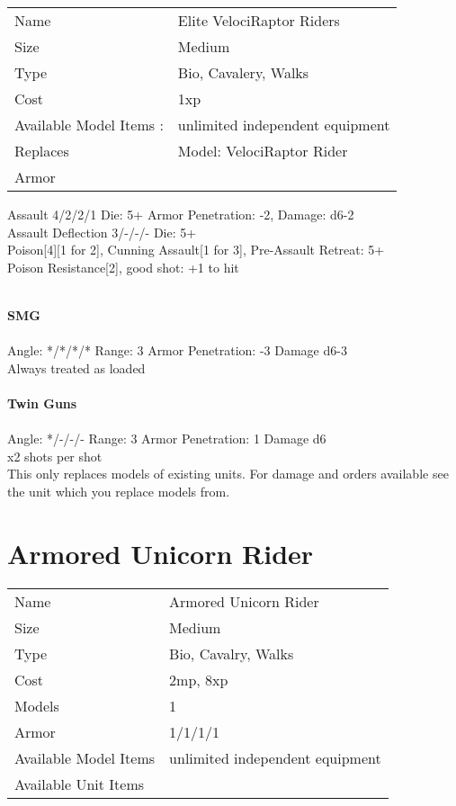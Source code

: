 \begin{tabular}{ll}
  Name & Elite VelociRaptor Riders \\
  Size & Medium\\
  Type & Bio, Cavalery, Walks\\
  Cost & 1xp\\
  Available Model Items : &unlimited independent equipment\\
  Replaces & Model: VelociRaptor Rider\\
  Armor & 
\end{tabular}



Assault 4/2/2/1 Die: 5+ Armor Penetration: -2, Damage: d6-2 \\
Assault Deflection 3/-/-/- Die: 5+\\
Poison[4][1 for 2], Cunning Assault[1 for 3], Pre-Assault Retreat: 5+
\ \\

Poison Resistance[2], good shot: +1 to hit

\ \\
{\bf SMG } \\
\ \\
Angle: */*/*/* Range: 3 Armor Penetration: -3 Damage d6-3 \\
\indent Always treated as loaded \\



\ \\
{\bf Twin Guns } \\
\ \\
Angle: */-/-/- Range: 3 Armor Penetration: 1 Damage d6 \\
\indent x2 shots per shot \\





This only replaces models of existing units. For damage and orders available see the unit which you replace models from.



\pagebreak

\section{ Armored Unicorn Rider }

\begin{tabular}{ll}
  Name & Armored Unicorn Rider \\
  Size & Medium\\
  Type & Bio, Cavalry, Walks\\
  Cost & 2mp, 8xp\\
  Models & 1\\
  Armor & 1/1/1/1\\
  Available Model Items & unlimited independent equipment \\
  Available Unit Items &  \\
\end{tabular}

